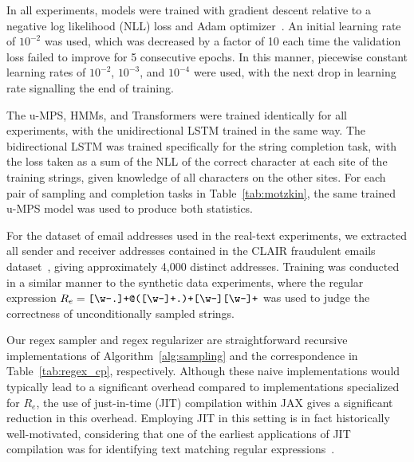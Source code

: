 In all experiments, models were trained with gradient descent relative to a negative log likelihood (NLL) loss and Adam optimizer~\citep{kingma2015}. An initial learning rate of $10^{-2}$ was used, which was decreased by a factor of 10 each time the validation loss failed to improve for 5 consecutive epochs. In this manner, piecewise constant learning rates of $10^{-2}$, $10^{-3}$, and $10^{-4}$ were used, with the next drop in learning rate signalling the end of training.

The u-MPS, HMMs, and Transformers were trained identically for all experiments, with the unidirectional LSTM trained in the same way. The bidirectional LSTM was trained specifically for the string completion task, with the loss taken as a sum of the NLL of the correct character at each site of the training strings, given knowledge of all characters on the other sites. For each pair of sampling and completion tasks in Table~\ref{tab:motzkin}, 
the same trained u-MPS model was used to produce both statistics.

For the dataset of email addresses used in the real-text experiments, we extracted all sender and receiver addresses contained in the CLAIR fraudulent emails dataset~\citep{radev2008}, giving approximately 4,000 distinct addresses. Training was conducted in a similar manner to the synthetic data experiments, where the regular expression $R_{e} = \verb![\w-.]+@([\w-]+.)+[\w-][\w-]+!$ was used to judge the correctness of unconditionally sampled strings.

Our regex sampler and regex regularizer are straightforward recursive implementations of Algorithm~\ref{alg:sampling} and the correspondence in Table~\ref{tab:regex_cp}, respectively. Although these naive implementations would typically lead to a significant overhead compared to implementations specialized for $R_e$, the use of just-in-time (JIT) compilation within JAX gives a significant reduction in this overhead. Employing JIT in this setting is in fact historically well-motivated, considering that one of the earliest applications of JIT compilation was for identifying text matching regular expressions~\citep{thompson1968}. 

% 
% 



